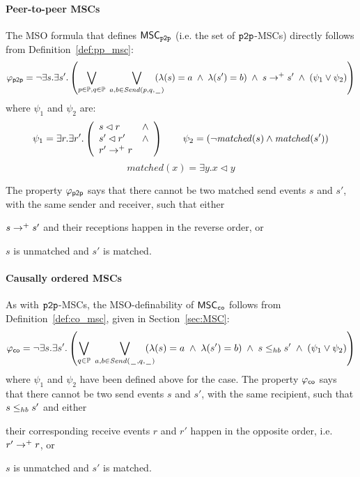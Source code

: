 \paragraph{\bf Peer-to-peer MSCs}
The MSO formula that defines $\mathsf{MSC}_{\mathtt{p2p}}$ (i.e. the set of $\mathtt{p2p}$-MSCs) directly follows from Definition~\ref{def:pp_msc}:
\[
	\varphi_{\mathsf{p2p}} = \neg \exists s.\exists s'. \left(
	\bigvee_{\substack{p \in \mathbb{P}, q \in \mathbb{P}}}\;
	\bigvee_{\substack{a,b \in {\mathit{Send}(p,q,\hspace{0.1em}\underline{\hspace{0.5em}}\hspace{0.1em})}}}\hspace{-1em}
	(\lambda(s) = a \;\wedge\; \lambda(s') = b) \;\wedge\; s \to^+ s' \;\wedge\;
	(\psi_1 \vee \psi_2 )
	\right)
\]
where $\psi_1$ and $\psi_2$ are:
\[
	\psi_1 = \exists r.\exists r'.\left(
	\begin{array}{ll}
		s \lhd r & \wedge\\
		s' \lhd r' & \wedge\\
		r' \to^+ r &
	\end{array}
	\right) \quad \quad
	\psi_2 = (\neg \mathit{matched}(s) \wedge \mathit{matched}(s'))
	\]
	\[
	matched(x) = \exists y. x \lhd y
\]

The property $\varphi_{\mathsf{p2p}}$ says that there cannot be two matched send events $s$ and $s'$, with the same sender and receiver, such that either
\begin{enumerate*}[label={(\roman*)}]
	\item $s \to^+ s'$ and their receptions happen in the reverse order, or
	\item $s$ is unmatched and $s'$ is matched.
\end{enumerate*}


\paragraph{\bf Causally ordered MSCs}
As with $\mathtt{p2p}$-MSCs, the MSO-definability of $\mathsf{MSC}_{\mathtt{co}}$ follows from Definition~\ref{def:co_msc}, given in Section~\ref{sec:MSC}:
\[
	\varphi_{\mathsf{co}} = \neg \exists s.\exists s'. \left(
	\bigvee_{\substack{q \in \mathbb{P}}}\;
	\bigvee_{\substack{a,b \in {\mathit{Send}(\hspace{0.1em}\underline{\hspace{0.5em}}\hspace{0.1em},q,\hspace{0.1em}\underline{\hspace{0.5em}}\hspace{0.1em})}}}\hspace{-1em}
	(\lambda(s) = a \;\wedge\; \lambda(s') = b) \;\wedge\; s \leq_{hb} s' \;\wedge\;
	(\psi_1 \vee \psi_2 )
	\right)
\]
where $\psi_1$ and $\psi_2$ have been defined above for the \pp case. The property $\varphi_{\mathsf{co}}$ says that there cannot be two send events $s$ and $s'$, with the same recipient, such that $s \leq_{hb} s'$ and either
\begin{enumerate*}[label={(\roman*)}]
	\item their corresponding receive events $r$ and $r'$ happen in the opposite order, i.e. $r' \to^+ r$, or
	\item $s$ is unmatched and $s'$ is matched.
\end{enumerate*}


